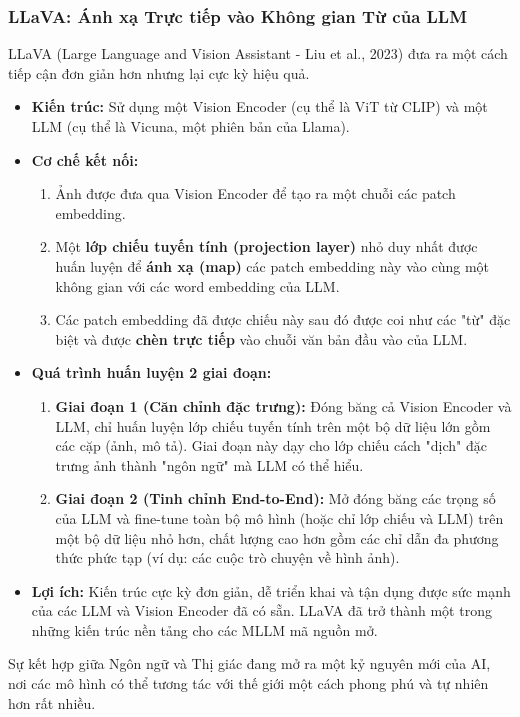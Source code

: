 \subsubsection{LLaVA: Ánh xạ Trực tiếp vào Không gian Từ của LLM}
LLaVA (Large Language and Vision Assistant - Liu et al., 2023) đưa ra một cách tiếp cận đơn giản hơn nhưng lại cực kỳ hiệu quả.
\begin{itemize}
    \item \textbf{Kiến trúc:} Sử dụng một Vision Encoder (cụ thể là ViT từ CLIP) và một LLM (cụ thể là Vicuna, một phiên bản của Llama).
    \item \textbf{Cơ chế kết nối:}
        \begin{enumerate}
            \item Ảnh được đưa qua Vision Encoder để tạo ra một chuỗi các patch embedding.
            \item Một \textbf{lớp chiếu tuyến tính (projection layer)} nhỏ duy nhất được huấn luyện để \textbf{ánh xạ (map)} các patch embedding này vào cùng một không gian với các word embedding của LLM.
            \item Các patch embedding đã được chiếu này sau đó được coi như các "từ" đặc biệt và được \textbf{chèn trực tiếp} vào chuỗi văn bản đầu vào của LLM.
        \end{enumerate}
    \item \textbf{Quá trình huấn luyện 2 giai đoạn:}
        \begin{enumerate}
            \item \textbf{Giai đoạn 1 (Căn chỉnh đặc trưng):} Đóng băng cả Vision Encoder và LLM, chỉ huấn luyện lớp chiếu tuyến tính trên một bộ dữ liệu lớn gồm các cặp (ảnh, mô tả). Giai đoạn này dạy cho lớp chiếu cách "dịch" đặc trưng ảnh thành "ngôn ngữ" mà LLM có thể hiểu.
            \item \textbf{Giai đoạn 2 (Tinh chỉnh End-to-End):} Mở đóng băng các trọng số của LLM và fine-tune toàn bộ mô hình (hoặc chỉ lớp chiếu và LLM) trên một bộ dữ liệu nhỏ hơn, chất lượng cao hơn gồm các chỉ dẫn đa phương thức phức tạp (ví dụ: các cuộc trò chuyện về hình ảnh).
        \end{enumerate}
    \item \textbf{Lợi ích:} Kiến trúc cực kỳ đơn giản, dễ triển khai và tận dụng được sức mạnh của các LLM và Vision Encoder đã có sẵn. LLaVA đã trở thành một trong những kiến trúc nền tảng cho các MLLM mã nguồn mở.
\end{itemize}

Sự kết hợp giữa Ngôn ngữ và Thị giác đang mở ra một kỷ nguyên mới của AI, nơi các mô hình có thể tương tác với thế giới một cách phong phú và tự nhiên hơn rất nhiều.

